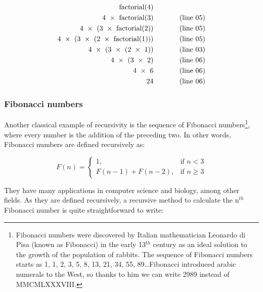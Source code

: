 \begin{equation*}
 \begin{aligned}
  \textrm{factorial(4)} & ~~~~~~~~~~~ \verb++\\
  \textrm{4 } \times \textrm{ factorial(3)} & ~~~~~~~~~~~ \textrm{(line 05)} \\
  \textrm{4 } \times \textrm{ (3 } \times \textrm{ factorial(2))} &  ~~~~~~~~~~~ \textrm{(line 05)} \\
  \textrm{4 } \times \textrm{ (3 } \times \textrm{ (2 } \times  \textrm{ factorial(1)))} & ~~~~~~~~~~~ \textrm{(line 05)}\\
  \textrm{4 } \times \textrm{ (3 } \times \textrm{ (2 } \times  \textrm{ 1))} & ~~~~~~~~~~~ \textrm{(line 03)}\\
  \textrm{4 } \times \textrm{ (3 } \times \textrm{ 2)} & ~~~~~~~~~~~ \textrm{(line 06)} \\
  \textrm{4 } \times \textrm{ 6} & ~~~~~~~~~~~ \textrm{(line 06)}\\
  \textrm{24} & ~~~~~~~~~~~ \textrm{(line 06)}\\
 \end{aligned}
\end{equation*}

\subsubsection{Fibonacci numbers}

Another classical example of recursivity is the sequence of Fibonacci
numbers\footnote{Fibonacci numbers were discovered by Italian mathematician
Leonardo di Pisa (known as Fibonacci) in the early 13$^{th}$ century
as an ideal solution to the growth of the population of rabbits. The
sequence of Fibonacci numbers starts as 1, 1, 2, 3, 5, 8, 13, 21, 34,
55, 89\ldots Fibonacci introduced arabic numerals to the West, so
thanks to him we can write 2989 instead of MMCMLXXXVIII.}, where every
number is the addition of the preceding two. 
In other words, Fibonacci numbers are defined recursively as:

$$ F(n) = 
  \begin{cases} 
    1,               & \mbox{if } n < 3 \\ 
    F(n-1) + F(n-2), & \mbox{if } n \ge 3
  \end{cases}
$$

They have many applications in computer science and biology, among
other fields. As they are defined recursively, a recursive method to
calculate the n$^{th}$ Fibonacci number is quite straightforward to
write: 

